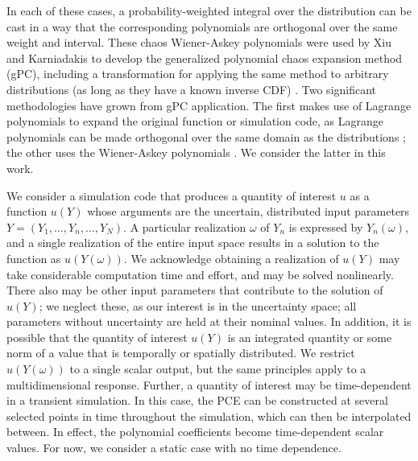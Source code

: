 In each of these cases, a probability-weighted
integral over the distribution can be cast in a way that the corresponding polynomials are orthogonal over the
same weight and interval.  These chaos Wiener-Askey polynomials were used by Xiu and Karniadakis to develop
the generalized polynomial chaos expansion method (gPC), including a transformation for applying the same
method to arbitrary distributions (as long as they have a known inverse CDF) \cite{xiu}.  Two significant
methodologies have grown from gPC application.  The first makes use of Lagrange polynomials to expand the
original function or simulation code, as Lagrange polynomials can be made orthogonal over the same domain as the
distributions \cite{SCLagrange}; the other uses the Wiener-Askey polynomials \cite{xiu}.  We consider the latter in this work.

We consider a simulation code that produces a quantity of interest $u$ as a function $u(Y)$ whose arguments are
the uncertain, distributed input
parameters $Y=(Y_1,\ldots,Y_n,\ldots,Y_N)$.  A particular realization $\omega$ of $Y_n$ is expressed by
$Y_n(\omega)$, and a single realization of the entire input space results in a solution to the function as
$u(Y(\omega))$.  We acknowledge obtaining a realization of $u(Y)$ may take considerable computation time and
effort, and may be solved nonlinearly.  There also may be other input parameters that
contribute to the solution of $u(Y)$; we neglect these, as our interest is in the uncertainty space; all
parameters without uncertainty are held at their nominal values.
In addition, it is possible that the quantity of interest $u(Y)$ is an integrated quantity or some norm of a
value that is temporally or spatially distributed. We restrict $u(Y(\omega))$ to a single scalar
output, but the same principles apply to a multidimensional response.  Further, a quantity of interest may be
time-dependent in a transient simulation.  In this case, the PCE can be constructed at several selected points
in time throughout the simulation, which can then be interpolated between.  In effect, the polynomial
coefficients become time-dependent scalar values.  For now, we consider a static case with no time dependence.

